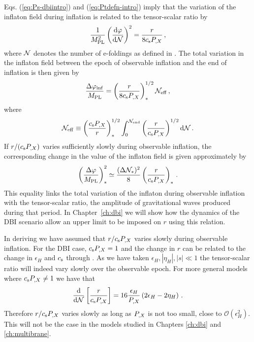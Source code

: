 Eqs. (\ref{eq:Ps-dbiintro}) and (\ref{eq:Ptdefn-intro}) imply 
that the variation of the inflaton field during inflation  
is related to the tensor-scalar ratio by \cite{lyth,bmpaper}
% 
\begin{equation}
\label{eq:genlyth-dbiintro}
\frac{1}{M_{\mathrm{PL}}^2}
\left( \frac{\mathrm{d} \varphi}{\mathrm{d} \mathcal{N}} \right)^2 = \frac{r}{8 c_\mathrm{s} P_{,X}}
\,,
\end{equation}
% 
where $\mathcal{N}$ denotes the number of e-foldings as defined in
. 
The total variation in the inflaton field between the epoch of observable 
inflation and the end of inflation is then given by
% 
\begin{equation}
\label{eq:totalfield-dbiintro}
\frac{\Delta \varphi_{\rm inf}}{M_{\mathrm{PL}}} = 
\left( \frac{r}{8 c_\mathrm{s} P_{,X}} \right)_*^{1/2} \mathcal{N}_\mathrm{eff} \,,
\end{equation}
% 
where
% 
\begin{equation}
\label{eq:Neff-dbiintro}
\mathcal{N}_\mathrm{eff} \equiv \left( \frac{c_\mathrm{s} P_{,X}}{r}\right)_*^{1/2}
\int_0^{\mathcal{N}_{\rm end}}  
\left( \frac{r}{c_\mathrm{s} P_{,X}} \right)^{1/2} \mathrm{d} \mathcal{N} \,.
\end{equation}
% 
If $r/(c_\mathrm{s} P_{,X})$ varies 
sufficiently slowly during observable inflation, 
the corresponding change in the value of the inflaton  
field is given approximately by \cite{lyth,bmpaper}
% 
\begin{equation}
\label{eq:approxlyth-dbiintro}
\left( \frac{\Delta \varphi}{M_{\mathrm{PL}}} \right)_*^2 \simeq 
\frac{(\Delta \mathcal{N}_*)^2}{8} \left( \frac{r}{c_\mathrm{s} P_{,X}} \right)_* \,.
\end{equation}
% 
This equality links the total variation of the inflaton during observable inflation
with the tensor-scalar ratio, \iec the amplitude of gravitational waves produced
during that period. In Chapter~\ref{ch:dbi} we will show how the dynamics of the
DBI scenario allow an upper limit to be imposed on $r$ using this relation.

In deriving  we have assumed that $r/c_\mathrm{s} P_{,X}$ varies slowly during
observable inflation. For the DBI case, $c_\mathrm{s} P_{,X} = 1$ and the change in $r$ can be related to the
change in $\epsilon_H$ and $c_\mathrm{s}$ through . As we have taken $\epsilon_H,
|\eta_H|,|s|\ll 1$ the tensor-scalar ratio will indeed vary slowly over the observable epoch.
% 
For more general models where $c_\mathrm{s} P_{,X} \ne 1$ we have that
% 
\begin{equation}
 \frac{\mathrm{d} }{\mathrm{d} \mathcal{N}}\left[ \frac{r}{c_\mathrm{s} P_{,X}}\right] = 16\frac{\epsilon_H}{P_{,X}}\left( 2\epsilon_H
-2\eta_H\right)\,.
\end{equation}
% 
Therefore $r/c_\mathrm{s}P_{,X}$ varies slowly as long as $P_{,X}$ is not too small, \iec close to
$\mathcal{O}(\epsilon_H^2)$. This will not be the case in the models studied in Chapters
\ref{ch:dbi} and \ref{ch:multibrane}.


